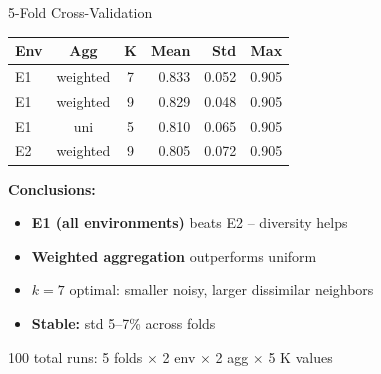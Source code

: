 \documentclass[aspectratio=169]{beamer}
\begin{document}
\begin{frame}{5-Fold Cross-Validation}
  \begin{table}
    \centering
    \small
    \begin{tabular}{@{}lccrrr@{}}
      \toprule
      \textbf{Env} & \textbf{Agg} & \textbf{K} & \textbf{Mean} & \textbf{Std} & \textbf{Max} \\
      \midrule
      \rowcolor{mycoLight!20}
      E1 & weighted & 7 & 0.833 & 0.052 & 0.905 \\
      E1 & weighted & 9 & 0.829 & 0.048 & 0.905 \\
      E1 & uni & 5 & 0.810 & 0.065 & 0.905 \\
      E2 & weighted & 9 & 0.805 & 0.072 & 0.905 \\
      \bottomrule
    \end{tabular}
  \end{table}

  \textbf{Conclusions:}
  \begin{itemize}
    \item \textbf{E1 (all environments)} beats E2 -- diversity helps
    \item \textbf{Weighted aggregation} outperforms uniform
    \item \textbf{$k=7$} optimal: smaller noisy, larger dissimilar neighbors
    \item \textbf{Stable:} std 5--7\% across folds
  \end{itemize}
  {\small 100 total runs: 5 folds $\times$ 2 env $\times$ 2 agg $\times$ 5 K values}
\end{frame}
\end{document}
